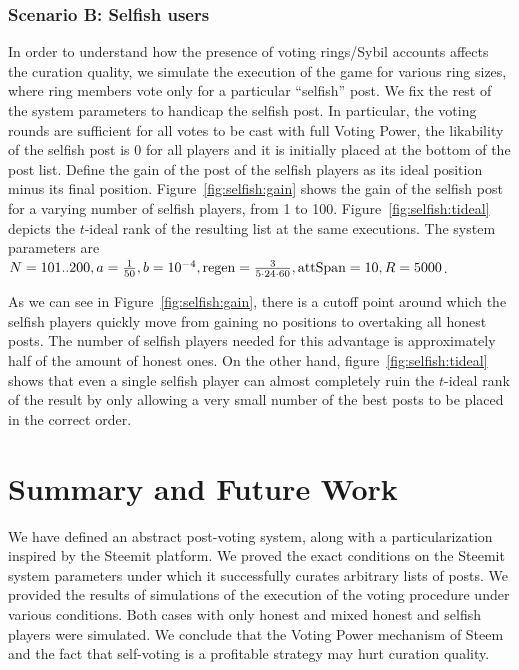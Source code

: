 \documentclass[a4paper,english,cleveref, autoref]{oasics-v2019}
\begin{document}
    \subsubsection{Scenario B: Selfish users}
      In order to understand how the presence of voting rings/Sybil accounts
      affects the curation quality, we simulate the execution of the game for
      various ring sizes, where ring members vote only for a particular
      ``selfish'' post. We fix the rest of the system parameters to handicap the
      selfish post. In particular, the voting rounds are sufficient for all
      votes to be cast with full Voting Power, the likability of the selfish
      post is 0 for all players and it is initially placed at the bottom of the
      post list. Define the gain of the post of the selfish players as its ideal
      position minus its final position. Figure~\ref{fig:selfish:gain} shows the
      gain of the selfish post for a varying number of selfish players, from 1
      to 100.  Figure~\ref{fig:selfish:tideal} depicts the $t$-ideal rank of the
      resulting list at the same executions. The system parameters are
      $N = 101 .. 200, a = \frac{1}{50}, b = 10^{-4}, \mathrm{regen} =
      \frac{3}{5 \cdot 24 \cdot 60}, \mathrm{attSpan} = 10, R = 5000$.

      As we can see in Figure~\ref{fig:selfish:gain}, there is a cutoff point
      around which the selfish players quickly move from gaining no positions to
      overtaking all honest posts. The number of selfish players needed for this
      advantage is approximately half of the amount of honest ones. On the other
      hand, figure~\ref{fig:selfish:tideal} shows that even a single selfish
      player can almost completely ruin the $t$-ideal rank of the result by
      only allowing a very small number of the best posts to be placed in the
      correct order.
\section{Summary and Future Work}

  We have defined an abstract post-voting system, along with a particularization
  inspired by the Steemit platform. We proved the exact conditions on the
  Steemit system parameters under which it successfully curates arbitrary lists
  of posts. We provided the results of simulations of the execution of the
  voting procedure under various conditions. Both cases with only honest and
  mixed honest and selfish players were simulated. We conclude that the Voting
  Power mechanism of Steem and the fact that self-voting is a profitable
  strategy may hurt curation quality.
\end{document}
